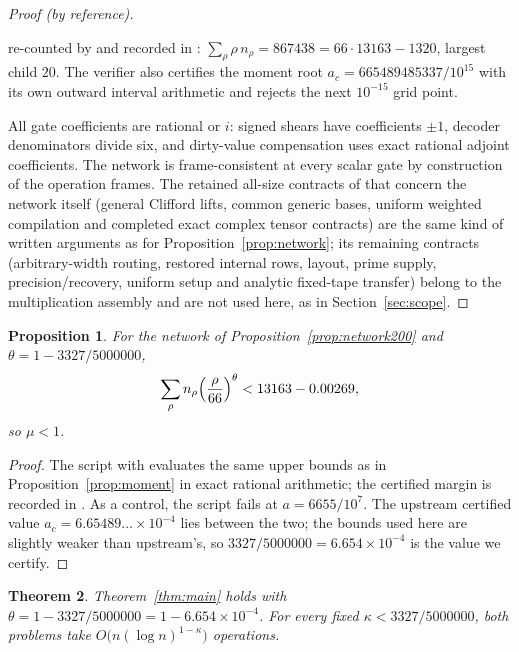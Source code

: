 \documentclass[11pt]{article}
\newtheorem{theorem}{Theorem}[section]
\newtheorem{proposition}[theorem]{Proposition}
\theoremstyle{definition}
\begin{document}
\begin{proof}[Proof (by reference)]
\begin{enumerate}
   re-counted by  and
  recorded in : $\sum_\rho\rho\,n_\rho=867438=
  66\cdot13163-1320$, largest child $20$. The verifier also certifies the
  moment root $a_c=665489485337/10^{15}$ with its own outward interval
  arithmetic and rejects the next $10^{-15}$ grid point.
\end{enumerate}
All gate coefficients are rational or $i$: signed shears have coefficients
$\pm1$, decoder denominators divide six, and dirty-value compensation uses
exact rational adjoint coefficients. The network is frame-consistent at every
scalar gate by construction of the operation frames. The retained all-size
contracts of \cite{pr200} that concern the network itself (general Clifford
lifts, common generic bases, uniform weighted compilation and completed exact
complex tensor contracts) are the same kind of written arguments as for
Proposition~\ref{prop:network}; its remaining contracts (arbitrary-width
routing, restored internal rows, layout, prime supply, precision/recovery,
uniform setup and analytic fixed-tape transfer) belong to the multiplication
assembly and are not used here, as in Section~\ref{sec:scope}.
\end{proof}

\begin{proposition}\label{prop:moment200}
For the network of Proposition~\ref{prop:network200} and
$\theta=1-3327/5000000$,
\[
 \sum_\rho n_\rho\Bigl(\frac\rho{66}\Bigr)^{\theta}<13163-0.00269,
\]
so $\mu<1$.
\end{proposition}

\begin{proof}
The script  with
 evaluates the same
upper bounds as in Proposition~\ref{prop:moment} in exact rational arithmetic;
the certified margin is recorded in . As
a control, the script fails at $a=6655/10^{7}$. The upstream certified value
$a_c=6.65489\ldots\times10^{-4}$ lies between the two; the bounds used here are
slightly weaker than upstream's, so $3327/5000000=6.654\times10^{-4}$ is the
value we certify.
\end{proof}

\begin{theorem}\label{thm:main200}
Theorem~\ref{thm:main} holds with $\theta=1-3327/5000000=1-6.654\times10^{-4}$.
For every fixed $\kappa<3327/5000000$, both problems take
$O\bigl(n(\log n)^{1-\kappa}\bigr)$ operations.
\end{theorem}
\end{document}
